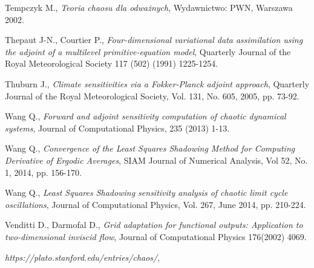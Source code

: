 \documentclass[12pt]{article}
\begin{document}
\begin{thebibliography}{99}
 Tempczyk M., 
\emph{Teoria chaosu dla odważnych},
Wydawnictwo: PWN, Warszawa 2002.
	
 Thepaut J-N., Courtier P., 
\emph{Four-dimensional variational data assimilation using the adjoint of a multilevel primitive-equation model},
Quarterly Journal of the Royal Meteorological Society 117 (502) (1991) 1225-1254.

 Thuburn J.,
\emph{Climate sensitivities via a Fokker-Planck adjoint approach},
Quarterly Journal of the Royal Meteorological Society, Vol. 131, No. 605, 2005, pp. 73-92.

 Wang Q.,
\emph{Forward and adjoint sensitivity computation of chaotic dynamical systems},
Journal of Computational Physics, 235 (2013) 1-13.

 Wang Q.,
\emph{Convergence of the Least Squares Shadowing Method for Computing Derivative of Ergodic Averages},
SIAM Journal of Numerical Analysis, Vol 52, No. 1, 2014, pp. 156-170.  

 Wang Q., 
\emph{Least Squares Shadowing sensitivity analysis of chaotic limit cycle oscillations},
Journal of Computational Physics, Vol. 267, June 2014, pp. 210-224.  

 Venditti D., Darmofal D.,
\emph{Grid adaptation for functional outputs: Application to two-dimensional inviscid flow},
Journal of Computational Physics 176(2002) 4069.

\emph{https://plato.stanford.edu/entries/chaos/},
\end{thebibliography} 
\end{document}

